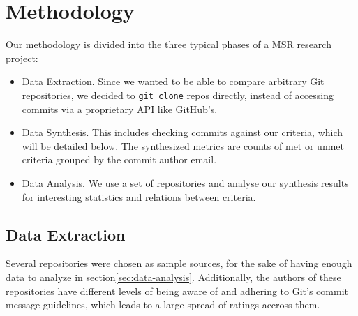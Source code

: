 \section{Methodology}
\label{sec:methodology}

Our methodology is divided into the three typical phases of a MSR research project:


\begin{itemize}
  \item Data Extraction. Since we wanted to be able to compare arbitrary Git repositories, we decided to \texttt{git clone} repos directly, instead of accessing commits via a proprietary API like GitHub's.
  \item Data Synthesis. This includes checking commits against our criteria, which will be detailed below. The synthesized metrics are counts of met or unmet criteria grouped by the commit author email.
  \item Data Analysis. We use a set of repositories and analyse our synthesis results for interesting statistics and relations between criteria.
\end{itemize}


\subsection{Data Extraction}
\label{sec:data-extraction}

Several repositories were chosen as sample sources, for the sake of having enough data to analyze in section\ref{sec:data-analysis}. Additionally, the authors of these repositories have different levels of being aware of and adhering to Git's commit message guidelines\cite{OffGuide}, which leads to a large spread of ratings accross them.

